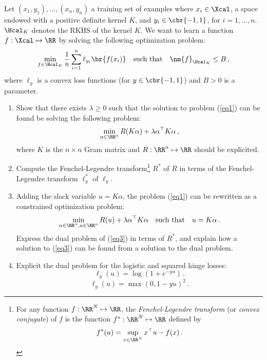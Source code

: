 \documentclass[12pt]{article}
\newcounter{exo}
\newenvironment{exo}[1]{\refstepcounter{exo}\vspace{0.5cm}{\bfseries Exercice \theexo. #1\\ }}{\par\vspace{0.5cm}}
\begin{document}
 \begin{exo}{Duality}
Let $(x_1,y_1), \ldots, (x_n,y_n)$ a training set of examples where $x_i\in\Xcal$, a space endowed with a positive definite kernel $K$, and $y_i\in\cbr{-1,1}$, for $i=1,\ldots,n$. $\Hcal_K$ denotes the RKHS of the kernel $K$. We want to learn a function $f:\Xcal\mapsto\RR$ by solving the following optimization problem:
\begin{equation}\label{eq1}
\min_{f \in \Hcal_K} \frac{1}{n} \sum_{i=1}^n \ell_{y_i}\br{f(x_i)} \quad\text{such that}\quad \nm{f}_{\Hcal_K}\leq B \,,
\end{equation}
where $\ell_y$ is a convex loss functions (for $y\in\cbr{-1,1}$) and $B>0$ is a parameter.
\begin{enumerate}
\item Show that there exists $\lambda\geq 0$ such that the solution to problem (\ref{eq1}) can be found be solving the following problem:
\begin{equation}\label{eq2}
\min_{\alpha\in\RR^n} R(K\alpha) +\lambda \alpha^\top K \alpha\,,
\end{equation}
where $K$ is the $n\times n$ Gram matrix and $R:\RR^n\mapsto \RR$ should be explicited.
\item Compute the Fenchel-Legendre transform\footnote{For any function $f:\RR^N \mapsto \RR$, the \emph{Fenchel-Legendre transform} (or \emph{convex conjugate}) of $f$ is the function $f^*:\RR^N \mapsto \RR$ defined by 
$$
f^*(u) = \sup_{x\in\RR^N} x^\top u - f(x)\,.
$$
} $R^*$ of $R$ in terms of the Fenchel-Legendre transform $\ell_y^*$ of $\ell_y$.
\item Adding the slack variable $u=K\alpha$, the problem (\ref{eq1}) can be rewritten as a constrained optimization problem:
\begin{equation}\label{eq3}
\min_{\alpha\in\RR^n, u\in\RR^n} R(u) +\lambda \alpha^\top K \alpha\quad\text{such that}\quad u=K\alpha\,.
\end{equation}
Express the dual problem of (\ref{eq3}) in terms of $R^*$, and explain how a solution to (\ref{eq3}) can be found from a solution to the dual problem.
\item Explicit the dual problem for the logistic and squared hinge losses: $$\ell_y(u) = \log(1+e^{-yu})\,.$$ $$\ell_y(u) = \max(0,1-yu)^2\,.$$
\end{enumerate}
\end{exo}
\end{document}
